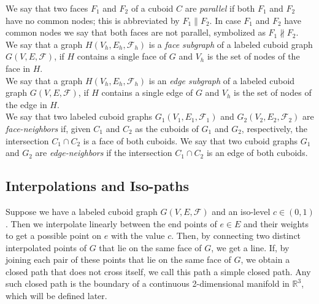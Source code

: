 \documentclass[a4paper,11pt]{article}
\begin{document}
 We say that two faces $F_1$ and $F_2$ of a cuboid $C$ are {\it parallel} if
both $F_1$ and $F_2$ have no common nodes; this is abbreviated by $F_1\parallel F_2$. In case $F_1$ and $F_2$
have common nodes we say that both faces are not parallel, symbolized as $F_1 \nparallel F_2$.\\

We say that a graph $H(V_h,E_h,\mathcal{F}_h)$ is a
{\it face subgraph} of a labeled cuboid graph $G(V,E,\mathcal{F})$, if $H$ contains a single face of $G$ and $V_h$
is the set of nodes of the face in $H$.\\

We say that a graph $H(V_h,E_h,\mathcal{F}_h)$ is an
{\it edge subgraph} of a labeled cuboid graph $G(V,E,\mathcal{F})$, if $H$ contains a single edge of $G$ and $V_h$
is the set of nodes of the edge in $H$.\\

We say that two labeled cuboid graphs $G_1(V_1,E_1,\mathcal{F}_1)$ and
$G_2(V_2,E_2,\mathcal{F}_2)$ are {\it face-neighbors} if, given $C_1$ and $C_2$ as the cuboids of $G_1$ and
$G_2$, respectively, the intersection $C_1\cap C_2$ is a face of both cuboids. We say that two cuboid graphs
$G_1$ and $G_2$ are {\it edge-neighbors} if the intersection $C_1\cap C_2$ is an edge of both cuboids.

\subsection{Interpolations and Iso-paths}
Suppose we have a labeled cuboid graph $G(V,E,\mathcal{F})$ and an iso-level $c\in (0,1)$. Then we
interpolate linearly between the end points of $e\in E$ and their weights to get a possible point on $e$
with the value $c$. Then, by connecting two distinct interpolated points of $G$ that lie on the same face
of $G$, we get a line. If, by joining each pair of these points that lie on the same face of $G$, we obtain
a closed path that does not cross itself, we call this path a simple closed path. Any such closed path
is the boundary of a continuous 2-dimensional manifold in $\mathbb{R}^3$, which will be defined later.
\end{document}
